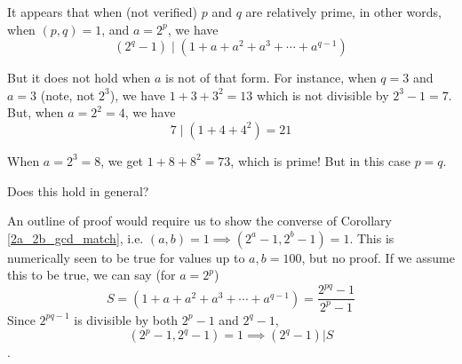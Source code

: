 \documentclass{article}
\begin{document}
\begin{discussion}
It appears that when (not verified) $p$ and $q$ are
relatively prime, in other words, when $(p,q) = 1$, and $a = 2^p$, we have
\[(2^q - 1) \mid (1 + a + a^2 + a^3 + \cdots + a^{q-1})\]

But it does not hold when $a$ is not of that form. For instance, when
$q = 3$ and $a = 3$ (note, not $2^3$), we have $1 + 3 + 3^2 = 13$ which
is not divisible by $2^3 - 1 = 7$. But, when $a = 2^2 = 4$, we have
\[7 \mid (1 + 4 + 4^2) = 21\]

When $a = 2^3 = 8$, we get $1 + 8 + 8^2 = 73$, which is prime! But in
this case $p = q$.

Does this hold in general?

An outline of proof would require us to show the converse of Corollary
\ref{2a_2b_gcd_match}, i.e.
$(a,b) = 1 \implies (2^a - 1,2^b-1) = 1$.
This is numerically seen to be true for values up to $a,b=100$, but no
proof. If we assume this to be true, we can say (for $a = 2^p$)
\[ S = (1 + a + a^2 + a^3 + \cdots + a^{q-1}) = \frac{2^{pq}-1}{2^p-1}\]
Since $2^{pq - 1}$ is divisible by both $2^p - 1$ and $2^q - 1$,
\[(2^p - 1,2^q-1) = 1 \implies (2^q - 1) | S\].

\end{discussion}
\end{document}
